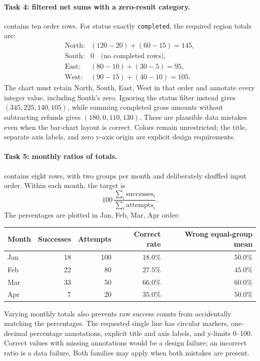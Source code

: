 \documentclass[11pt]{article}
\begin{document}
\paragraph{Task 4: filtered net sums with a zero-result category.}
 contains ten order rows.
For status exactly \texttt{completed}, the required region totals are:
\[
\begin{array}{ll}
\text{North}: &(120-20)+(60-15)=145,\\
\text{South}: &0\quad\text{(no completed rows)},\\
\text{East}:  &(80-10)+(30-5)=95,\\
\text{West}:  &(90-15)+(40-10)=105.
\end{array}
\]
The chart must retain North, South, East, West in that order and annotate
every integer value, including South's zero.
Ignoring the status filter instead gives $(345,225,140,105)$, while summing
completed gross amounts without subtracting refunds gives $(180,0,110,130)$.
These are plausible data mistakes even when the bar-chart layout is correct.
Colors remain unrestricted; the title, separate axis labels, and zero y-axis
origin are explicit design requirements.

\paragraph{Task 5: monthly ratios of totals.}
 contains eight rows, with two groups per month
and deliberately shuffled input order. Within each month, the target is
\[
100\,\frac{\sum_i \text{successes}_i}{\sum_i \text{attempts}_i}.
\]
The percentages are plotted in Jan, Feb, Mar, Apr order:
\begin{center}
\small
\begin{tabular}{lrrrr}
\toprule
Month & Successes & Attempts & Correct rate & Wrong equal-group mean \\
\midrule
Jan & 18 & 100 & $18.0\%$ & $50.0\%$ \\
Feb & 22 & 80  & $27.5\%$ & $45.0\%$ \\
Mar & 33 & 50  & $66.0\%$ & $60.0\%$ \\
Apr & 7  & 20  & $35.0\%$ & $50.0\%$ \\
\bottomrule
\end{tabular}
\end{center}
Varying monthly totals also prevents raw success counts from accidentally
matching the percentages. The requested single line has circular markers,
one-decimal percentage annotations, explicit title and axis labels, and
y-limits 0--100. Correct values with missing annotations would be a design
failure; an incorrect ratio is a data failure. Both families may apply when
both mistakes are present.
\end{document}
